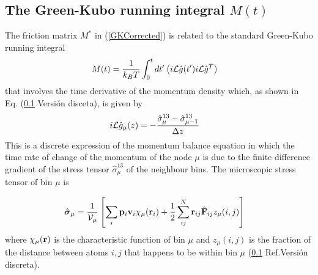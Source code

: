 \documentclass[a4paper,openright,12pt]{book}
\newcommand{\Pendiente}[1]{{\color{green}#1}} %
\newcommand{\llangle}{\left\langle}
\newcommand{\rrangle}{\right\rangle}
\begin{document}
\subsection{The Green-Kubo running integral $M(t)$}
The friction matrix $M^*$ in (\ref{GKCorrected}) is
related to the standard Green-Kubo running integral
\begin{align}
M(t)&=\frac{1}{k_BT}\int_0^{t}dt' \llangle i{\cal L}\hat{g}(t')i{\cal L}\hat{g}^T\rrangle
\label{Mmunu}
\end{align}
that  involves the  time
derivative of the  momentum density which, as shown  in Eq. \Pendiente{(\ref{} Versión disceta)}, is
given by
\begin{align}
  i{\cal L}  \hat{g}_{\mu}(z)&=-\frac{\hat{\sigma}^{13}_{\mu}-\hat{\sigma}^{13}_{\mu-1}}{\Delta z}
\label{iLAcurrentx}
\end{align}
This  is a  discrete expression  of the  momentum balance  equation in
which the time rate of change of the momentum of the node $\mu$ is due
to   the   finite   difference   gradient   of   the   stress   tensor
$\hat{\sigma}^{13}_{\mu}$  of  the  neighbour bins.   The 
microscopic   stress   tensor   of  bin $\mu$ is 

\begin{align}
 \hat{ \boldsymbol{\sigma}}_{\mu}
&=
\frac{1}{{\cal V}_\mu} \left[\sum_i{\bf p}_i{\bf v}_i\chi_\mu({\bf r}_i)
+\frac{1}{2}\sum^{N}_{ij}{\bf r}_{ij}\hat{\bf F}_{ij}z_\mu(i,j)\right]
\label{sbin}
\end{align}
where $\chi_\mu({\bf r})$ is the  characteristic function of bin $\mu$
and $z_{\mu}(i,j)$ is the fraction of the distance between atoms $i,j$
that happens to be within bin $\mu$ (\Pendiente{\ref{} Ref.Versión discreta}).
\end{document}
